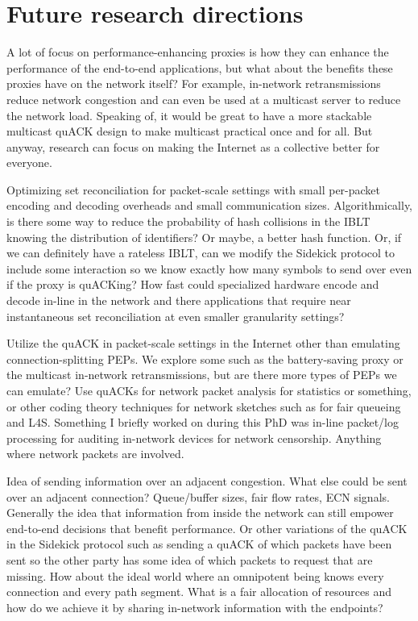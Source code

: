 \section{Future research directions}
\label{sec:conclusion:future}

A lot of focus on performance-enhancing proxies is how they can enhance the
performance of the end-to-end applications, but what about the benefits these
proxies have on the network itself? For example, in-network retransmissions
reduce network congestion and can even be used at a multicast server to reduce
the network load. Speaking of, it would be great to have a more stackable
multicast quACK design to make multicast practical once and for all. But
anyway, research can focus on making the Internet as a collective better for
everyone.

Optimizing set reconciliation for packet-scale settings with small per-packet
encoding and decoding overheads and small communication sizes. Algorithmically,
is there some way to reduce the probability of hash collisions in the IBLT
knowing the distribution of identifiers? Or maybe, a better hash function. Or,
if we can definitely have a rateless IBLT, can we modify the Sidekick protocol
to include some interaction so we know exactly how many symbols to send over
even if the proxy is quACKing? How fast could specialized hardware encode and
decode in-line in the network and there applications that require near
instantaneous set reconciliation at even smaller granularity settings?

Utilize the quACK in packet-scale settings in the Internet other than emulating
connection-splitting PEPs. We explore some such as the battery-saving proxy or
the multicast in-network retransmissions, but are there more types of PEPs we
can emulate? Use quACKs for network packet analysis for statistics or
something, or other coding theory techniques for network sketches such as for
fair queueing and L4S. Something I briefly worked on during this PhD was
in-line packet/log processing for auditing in-network devices for network
censorship. Anything where network packets are involved.

Idea of sending information over an adjacent congestion. What else could be sent
over an adjacent connection? Queue/buffer sizes, fair flow rates, ECN signals.
Generally the idea that information from inside the network can still empower
end-to-end decisions that benefit performance. Or other variations of the quACK
in the Sidekick protocol such as sending a quACK of which packets have been
sent so the other party has some idea of which packets to request that are
missing. How about the ideal world where an omnipotent being knows every
connection and every path segment. What is a fair allocation of resources and
how do we achieve it by sharing in-network information with the endpoints?

